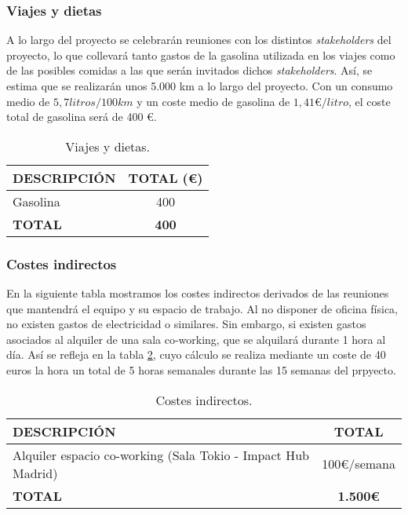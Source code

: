 \subsubsection{Viajes y dietas}
\par A lo largo del proyecto se celebrarán reuniones con los distintos \textit{stakeholders} del proyecto, lo que collevará tanto gastos de la gasolina utilizada en los viajes como de las posibles comidas a las que serán invitados dichos \textit{stakeholders}. Así, se estima que se realizarán unos 5.000 km a lo largo del proyecto. Con un consumo medio de $5,7 litros /100km$ y un coste medio de gasolina de $1,41 \euro/litro$, el coste total de gasolina será de 400 \euro.

\begin{table}[H]
\begin{center}
\begin{tabular}{l c}
\textbf{DESCRIPCIÓN} & \textbf{TOTAL (\euro)}\\ \hline \hline
Gasolina & 400\\
\textbf{TOTAL} & \textbf{400}\\ \hline
\end{tabular}
\caption{Viajes y dietas.}
\label{tab:viajes}
\end{center}
\end{table}


\subsubsection{Costes indirectos}
En la siguiente tabla mostramos los costes indirectos derivados de las reuniones que mantendrá el equipo y su espacio de trabajo. Al no disponer de oficina física, no existen gastos de electricidad o similares. Sin embargo, si existen gastos asociados al alquiler de una sala co-working, que se alquilará durante 1 hora al día. Así se refleja en la tabla \ref{tab:indirectos}, cuyo cálculo se realiza mediante un coste de 40 euros la hora un total de 5 horas semanales durante las 15 semanas del prpyecto.

\begin{table}[H]
\begin{center}
\begin{tabular}{l c}
\textbf{DESCRIPCIÓN} & \textbf{TOTAL}\\ \hline \hline
Alquiler espacio co-working (Sala Tokio - Impact Hub Madrid) & 100\euro/semana\\ \hline \hline
\textbf{TOTAL} & \textbf{1.500\euro}\\ \hline
\end{tabular}
\caption{Costes indirectos.}
\label{tab:indirectos}
\end{center}
\end{table}


